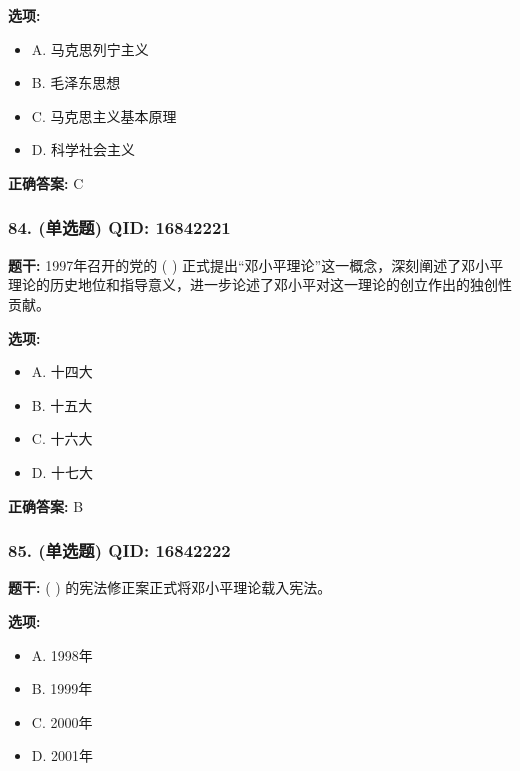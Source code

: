 \documentclass[12pt,UTF8]{ctexart}
\begin{document}
\textbf{选项:}
\begin{itemize}[leftmargin=*]

  \item A. 马克思列宁主义

  \item B. 毛泽东思想

  \item C. 马克思主义基本原理

  \item D. 科学社会主义

\end{itemize}

\textbf{正确答案:}
C

\vspace{0.3em}\hrulefill\vspace{0.7em}

\subsubsection*{84. (单选题) \small QID: 16842221}

\textbf{题干:}
1997年召开的党的 ( ) 正式提出“邓小平理论”这一概念，深刻阐述了邓小平理论的历史地位和指导意义，进一步论述了邓小平对这一理论的创立作出的独创性贡献。

\textbf{选项:}
\begin{itemize}[leftmargin=*]

  \item A. 十四大

  \item B. 十五大

  \item C. 十六大

  \item D. 十七大

\end{itemize}

\textbf{正确答案:}
B

\vspace{0.3em}\hrulefill\vspace{0.7em}

\subsubsection*{85. (单选题) \small QID: 16842222}

\textbf{题干:}
( ) 的宪法修正案正式将邓小平理论载入宪法。

\textbf{选项:}
\begin{itemize}[leftmargin=*]

  \item A. 1998年

  \item B. 1999年

  \item C. 2000年

  \item D. 2001年

\end{itemize}
\end{document}
